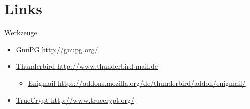 \section{Links}

\begin{frame}{Werkzeuge}
  \begin{itemize}
    \item \href{http://gnupg.org/}{GnuPG {\scriptsize http://gnupg.org/}}
    \item \href{http://www.thunderbird-mail.de/}{Thunderbird
	{\scriptsize http://www.thunderbird-mail.de}}
      \begin{itemize}
	\item
	  \href{https://addons.mozilla.org/de/thunderbird/addon/enigmail/}{Enigmail
	    {\scriptsize https://addons.mozilla.org/de/thunderbird/addon/enigmail/}}
      \end{itemize}
    \item \href{http://www.truecrypt.org/}{TrueCrypt {\scriptsize http://www.truecrypt.org/}}
  \end{itemize}

\end{frame}
